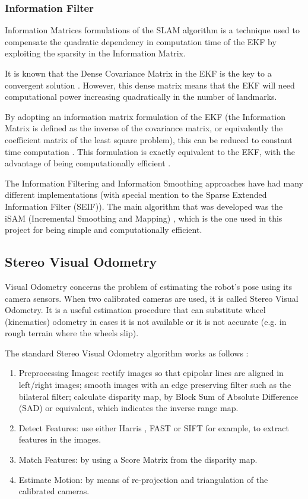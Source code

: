 \documentclass[12pt]{article}
\begin{document}
	\subsubsection{Information Filter}
Information Matrices formulations of the SLAM algorithm is a technique used to compensate the quadratic dependency in computation time of the EKF by exploiting the sparsity in the Information Matrix.

It is known that the Dense Covariance Matrix in the EKF is the key to a convergent solution \cite{SLAMPartI}. However, this dense matrix means that the EKF will need computational power increasing quadratically in the number of landmarks.
	
By adopting an information matrix formulation of the EKF (the Information Matrix is defined as the inverse of the covariance matrix, or equivalently the coefficient matrix of the least square problem), this can be reduced to constant time computation \cite{doi:10.1117/12.381658}. This formulation is exactly equivalent to the EKF, with the advantage of being computationally efficient \cite{Dellaert-2006-9639}.
	
The Information Filtering and Information Smoothing approaches have had many different implementations (with special mention to the Sparse Extended Information Filter (SEIF)\cite{doi:10.1117/12.381658}). The main algorithm that was developed was the iSAM (Incremental Smoothing and Mapping) \cite{Kaess08tro}, which is the one used in this project for being simple and computationally efficient.	
	
	\subsection{Stereo Visual Odometry}

Visual Odometry concerns the problem of estimating the robot's pose using its camera sensors. When two calibrated cameras are used, it is called Stereo Visual Odometry. It is a useful estimation procedure that can substitute wheel (kinematics) odometry in cases it is not available or it is not accurate (e.g. in rough terrain where the wheels slip).
	
The standard Stereo Visual Odometry algorithm works as follows \cite{StereoVis1}:

\begin{enumerate}[leftmargin=.8in]
\item Preprocessing Images: rectify images so that epipolar lines are aligned in left/right images; smooth images with an edge preserving filter such as the bilateral filter; calculate disparity map, by Block Sum of Absolute Difference (SAD) or equivalent, which indicates the inverse range map.
\item Detect Features: use either Harris \cite{Harris}, FAST \cite{FAST} or  SIFT \cite{SIFT} for example, to extract features in the images.
\item Match Features: by using a Score Matrix from the disparity map.
\item Estimate Motion: by means of re-projection and triangulation of the calibrated cameras.
\end{enumerate}
	
\end{document}
